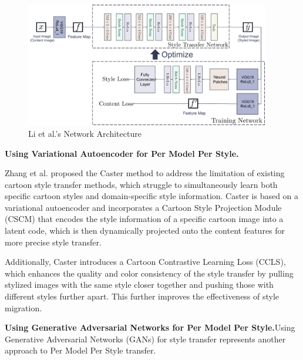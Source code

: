 \documentclass[preprint,12pt]{elsarticle}
\begin{document}
\begin{figure}[!htbp]%
    \centering%
    \includegraphics[width=0.95\textwidth]{Figure_6__Li_et_al_Network_Architecture.pdf}
    \caption{Li et al.'s Network Architecture\citep{35li2016precomputed}}\label{fig6_Ulyanov}
\end{figure}

\textbf{Using Variational Autoencoder for Per Model Per Style.}

Zhang et al.\citep{119zhang2023caster} proposed the Caster method to address the limitation of existing cartoon style transfer methods, which struggle to simultaneously learn both specific cartoon styles and domain-specific style information. Caster is based on a variational autoencoder and incorporates a Cartoon Style Projection Module (CSCM) that encodes the style information of a specific cartoon image into a latent code, which is then dynamically projected onto the content features for more precise style transfer.

Additionally, Caster introduces a Cartoon Contrastive Learning Loss (CCLS), which enhances the quality and color consistency of the style transfer by pulling stylized images with the same style closer together and pushing those with different styles further apart. This further improves the effectiveness of style migration.

\textbf{Using Generative Adversarial Networks for Per Model Per Style.}\quad Using Generative Adversarial Networks (GANs) for style transfer represents another approach to Per Model Per Style transfer.
\end{document}
